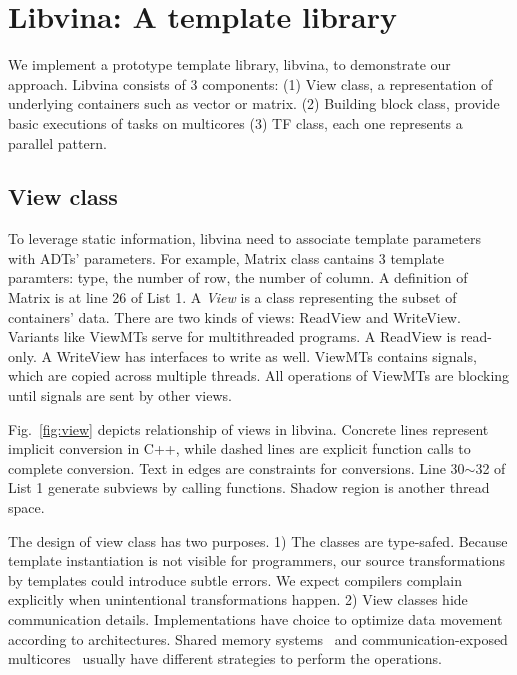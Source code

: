 \section{Libvina: A template library}\label{sec:lib}
We implement a prototype template library, libvina,  to demonstrate
our approach. Libvina consists of 3 components: (1) View class, a representation of underlying containers such as vector or matrix. (2) Building block class,
provide basic executions of tasks on multicores (3) TF class, each one
represents a parallel pattern. 

\subsection{View class}
To leverage static information, libvina need to
associate template parameters with ADTs' parameters. For example, 
Matrix class cantains 3 template paramters: type, the number of
row, the number of column. A definition of Matrix is at line 26 of
List 1. A \emph{View} is a class representing the subset of containers' data. There
are two kinds of views: ReadView and WriteView. Variants like
ViewMTs serve for multithreaded programs. 
A ReadView is read-only. A WriteView has interfaces to write  as
well. ViewMTs contains signals, which are copied across multiple
threads. All operations of ViewMTs are blocking until signals are sent
by other views.

Fig.~\ref{fig:view} depicts relationship of views in
libvina. Concrete lines represent implicit conversion in C++, while
dashed lines are explicit function calls to complete conversion. Text
in edges are constraints for conversions. Line 30$\sim$32 of
List 1 generate subviews by calling functions. Shadow region is
another thread space.

The design of view class has two purposes. 1) The classes are type-safed.
Because template instantiation is not visible for programmers, our
source transformations by templates could introduce subtle errors. We
expect compilers complain explicitly when unintentional
transformations happen. 2) View classes hide communication details. 
Implementations have choice to optimize data movement according to
architectures. Shared memory systems~\cite{larrabee} and communication-exposed multicores~\cite{cellbe, imagine} usually have different strategies to perform
the operations.

